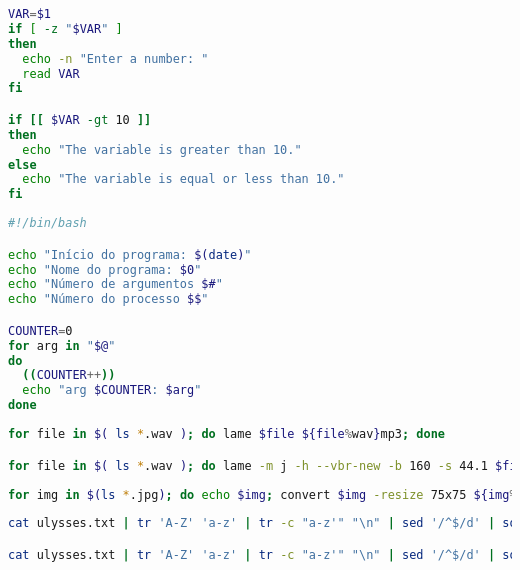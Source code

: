 \begin{frame}
\begin{lstlisting}[language=bash, label=lst-bash-if, caption={if else em Bash.}, postbreak=\mbox{$\hookrightarrow$\space}, basicstyle=\fontsize{8}{10}\selectfont\ttfamily]
VAR=$1
if [ -z "$VAR" ]
then
  echo -n "Enter a number: "
  read VAR
fi

if [[ $VAR -gt 10 ]]
then
  echo "The variable is greater than 10."
else
  echo "The variable is equal or less than 10."
fi
\end{lstlisting}

\framebreak

\begin{lstlisting}[language=bash, label=lst-argumentos, caption={argumentos Bash.}, postbreak=\mbox{$\hookrightarrow$\space}, basicstyle=\fontsize{8}{10}\selectfont\ttfamily]
#!/bin/bash

echo "Início do programa: $(date)"
echo "Nome do programa: $0"
echo "Número de argumentos $#"
echo "Número do processo $$"

COUNTER=0
for arg in "$@"
do
  ((COUNTER++))
  echo "arg $COUNTER: $arg"
done
\end{lstlisting}

\framebreak


\begin{lstlisting}[language=bash, label=lst-bash-convert-mp3, caption={Converter todos WAVs em MP3.}, postbreak=\mbox{$\hookrightarrow$\space}, basicstyle=\fontsize{8}{10}\selectfont\ttfamily]
for file in $( ls *.wav ); do lame $file ${file%wav}mp3; done

for file in $( ls *.wav ); do lame -m j -h --vbr-new -b 160 -s 44.1 $file -o ${file%wav}mp3; done
\end{lstlisting}

\begin{lstlisting}[language=bash, label=lst-bash-thumbnails, caption={Criar minuaturas de todas fotos.}, postbreak=\mbox{$\hookrightarrow$\space}, basicstyle=\fontsize{8}{10}\selectfont\ttfamily]
for img in $(ls *.jpg); do echo $img; convert $img -resize 75x75 ${img%%.jpg}_thumbnail.jpg; done
\end{lstlisting}

\framebreak

\begin{lstlisting}[language=bash, label=lst-bash-word-freq, caption={Listando as palavras por frequência de ocorrência.}, postbreak=\mbox{$\hookrightarrow$\space}, basicstyle=\fontsize{8}{10}\selectfont\ttfamily]
cat ulysses.txt | tr 'A-Z' 'a-z' | tr -c "a-z'" "\n" | sed '/^$/d' | sort | uniq -c | sort -k1nr -k2 > wordlist.txt

cat ulysses.txt | tr 'A-Z' 'a-z' | tr -c "a-z'" "\n" | sed '/^$/d' | sort | uniq -c | sort -k1nr -k2 | tail -n 100 | pr -c5 -t -w80
\end{lstlisting}


\end{frame}
